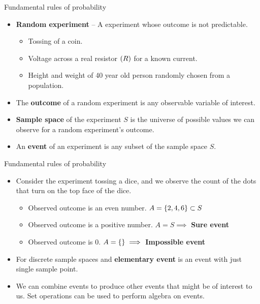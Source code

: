 \documentclass[aspectratio=169]{beamer}
\let\olditem\item
\renewcommand{\item}{\setlength{\itemsep}{\fill}\olditem}
\def\lp{\ensuremath\left(}
\def\rp{\ensuremath\right)}
\def\lc{\ensuremath\left\{}
\def\rc{\ensuremath\right\}}
\newcommand{\ct}[1]{\lp #1\rp}
\begin{document}
\begin{frame}[t]{Fundamental rules of probability}
\begin{itemize}
  \item \textbf{Random experiment} -- A experiment whose outcome is not predictable.
  
  \begin{itemize}
    \item Tossing of a coin.
    \item Voltage across a real resistor $\ct{R}$ for a known current.
    \item Height and weight of 40 year old person randomly chosen from a population.
  \end{itemize}

  \item The \textbf{outcome} of a random experiment is any observable variable of interest.

  \item \textbf{Sample space} of the experiment $S$ is the universe of possible values we can observe for a random experiment's outcome.

  \item An \textbf{event} of an experiment is any subset of the sample space $S$.
\end{itemize}
\end{frame}


\begin{frame}[t]{Fundamental rules of probability}
\begin{itemize}
  \item Consider the experiment tossing a dice, and we observe the count of the dots that turn on the top face of the dice.
  \begin{itemize}
    \item Observed outcome is an even number. $A = \lc 2, 4, 6\rc \subset S$
    \item Observed outcome is a positive number. $A = S \implies $ \textbf{Sure event}
    \item Observed outcome is 0. $A = \lc\rc \implies $ \textbf{Impossible event}
  \end{itemize}
  
  \item For discrete sample spaces and \textbf{elementary event} is an event with just single sample point.
  
  \item We can combine events to produce other events that might be of interest to us. Set operations can be used to perform algebra on events.
\end{itemize}
\end{frame}
\end{document}

